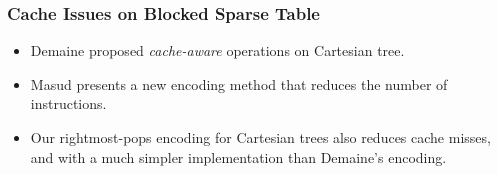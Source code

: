 \begin{frame}
	\frametitle{Cache Issues on Blocked Sparse Table}
	\begin{itemize}
		\setlength\itemsep{1em}
		\item
			Demaine proposed {\em cache-aware} operations on Cartesian
			tree.
		\item
			Masud presents a new encoding method that reduces the number
			of instructions.
		\item 
			Our rightmost-pops encoding for Cartesian trees also reduces
			cache misses, and with a much simpler implementation than
			Demaine's encoding.
	\end{itemize}
\end{frame}